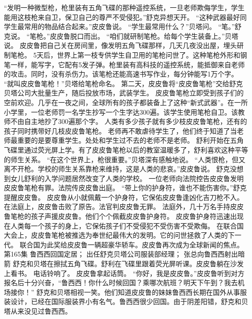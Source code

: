 \documentclass[a4paper,12pt,UTF8,twoside]{ctexbook}
\begin{document}
        “发明一种微型枪，枪里装有五角飞碟的那种遥控系统，一旦老师欺侮学生，学生能用这枝枪来自卫，保卫自己的尊严不受侵犯。”舒克异想天开。 
        “这种武器最好同学生最常用的物品结合起来。”皮皮鲁说。 
        “学生最常用什么？”贝塔问。 
        “笔。”舒克说。 
        “笔枪。”皮皮鲁脱口而出。 
        “咱们就研制笔枪。给每个学生装备上。”贝塔说。 
        皮皮鲁把自己关在房间里，像发明五角飞碟那样，几天几夜没出屋，埋头研制笔枪。 
        5天后，世界上第一枝专供学生自卫用的笔枪问世了。这种笔枪外形和钢笔一样，能写字，它配有5发子弹。枪里装有高科技的遥控系统，能抵御来自老师的攻击。同时，没有杀伤力。该笔枪还能高速书写作业，每分钟能写1万个字。 
        “就叫皮皮鲁笔枪！”贝塔给笔枪命名。 
        第二天，皮皮鲁将“皮皮鲁笔枪”交给舒克贝塔公司大批量生产，随后投放市场，武装学生。 
        皮皮鲁笔枪立即受到孩子们的空前欢迎。几乎在一夜之间，全球所有的孩子都装备上了这种“新式武器”。在一所小学里，一位老师罚一名学生抄写一个生字达300遍。该学生使用笔枪自卫。该教师不由自主地抄了300遍那个字。 
        人类有多少孩子就有多少枝皮皮鲁笔枪，还有的孩子同时携带好几枝皮皮鲁笔枪。 
        老师再不敢虐待学生了，他们终于知道了当老师最重要的是要尊重学生。处处和学生过不去的老师不是老师。 
        舒利开始在五角飞碟里通过荧光屏上学。有了皮皮鲁笔枪以后的教室温暖多了，舒利喜欢这种平等的师生关系。 
        “在这个世界上，枪很重要。”贝塔深有感触地说。 
        “人类恨枪，但又离不开枪。学校的师生关系靠枪来维持，这是人类的悲哀。”皮皮鲁说。 
        舒克没想到女儿舒利的入学问题居然改变了人类的学校。 
        一位老师向法院控告皮皮鲁发明皮皮鲁笔枪有罪。法院传皮皮鲁出庭。 
        “带上你的护身符，谁也不能伤害你。”舒克提醒皮皮鲁。 
        皮皮鲁从小就佩戴一个护身符，它保佑皮皮鲁逢凶化吉刀枪不入。 
        在法庭上，皮皮鲁击败了原告。法官判皮皮鲁无罪。 
        法庭外，几十万名手持皮皮鲁笔枪的孩子声援皮皮鲁。他们个个佩截皮皮鲁护身符。 
        皮皮鲁护身符迅速出现在人类每一个孩子的身上，它保佑孩子们不受侵犯不受伤害不受欺侮。 
        在联合国大会上，皮皮鲁笔枪被推选为奉世纪最伟大的发明。它的问世拯救了人类的下一代。 
        联合国为此奖给皮皮鲁一辆超豪华轿车。皮皮鲁再次成为全球新闻的焦点。   第165集 
        鲁西西回国定居； 
        出任舒克贝塔公司服装部经理； 
        张总向鲁西西射出暗箭   
        舒克和贝塔在擦拭五角飞碟。舒利在飞碟里跟着荧光屏听课。皮皮鲁躺在沙发上看书。 
        电话铃响了。 
        皮皮鲁拿起话筒。 
        “你好，我是皮皮鲁。”皮皮鲁听到对方报名后十分兴奋，“鲁西西！你什么时候回国？乘哪次航班？明天下午到？我去机场接你！” 
        舒克和贝塔相视一笑。他们知道皮皮鲁的妹妹鲁西西长期在国外从事服装设计，已经在国际服装界小有名气。鲁西西很少回国。由于阴差阳错，舒克和贝塔从来没见过鲁西西。 
\end{document}
